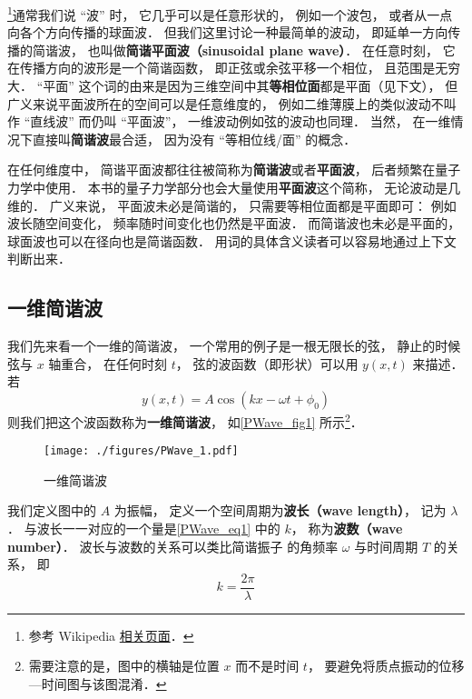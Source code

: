 

\footnote{参考 Wikipedia \href{https://en.wikipedia.org/wiki/Plane_wave}{相关页面}．}通常我们说 “波” 时， 它几乎可以是任意形状的， 例如一个波包， 或者从一点向各个方向传播的球面波． 但我们这里讨论一种最简单的波动， 即延单一方向传播的简谐波， 也叫做\textbf{简谐平面波（sinusoidal plane wave）}． 在任意时刻， 它在传播方向的波形是一个简谐函数， 即正弦或余弦平移一个相位， 且范围是无穷大． “平面” 这个词的由来是因为三维空间中其\textbf{等相位面}都是平面（见下文）， 但广义来说平面波所在的空间可以是任意维度的， 例如二维薄膜上的类似波动不叫作 “直线波” 而仍叫 “平面波”， 一维波动例如弦的波动也同理． 当然， 在一维情况下直接叫\textbf{简谐波}最合适， 因为没有 “等相位线/面” 的概念．

在任何维度中， 简谐平面波都往往被简称为\textbf{简谐波}或者\textbf{平面波}， 后者频繁在量子力学中使用． 本书的量子力学部分也会大量使用\textbf{平面波}这个简称， 无论波动是几维的． 广义来说， 平面波未必是简谐的， 只需要等相位面都是平面即可： 例如波长随空间变化， 频率随时间变化也仍然是平面波． 而简谐波也未必是平面的， 球面波也可以在径向也是简谐函数． 用词的具体含义读者可以容易地通过上下文判断出来．

\subsection{一维简谐波}
我们先来看一个一维的简谐波， 一个常用的例子是一根无限长的弦， 静止的时候弦与 $x$ 轴重合， 在任何时刻 $t$， 弦的波函数（即形状）可以用 $y(x, t)$ 来描述． 若
\begin{equation}\label{PWave_eq1}
y(x, t) = A\cos(k x - \omega t + \phi_0)
\end{equation}
则我们把这个波函数称为\textbf{一维简谐波}， 如\autoref{PWave_fig1} 所示\footnote{需要注意的是，图中的横轴是位置 $x$ 而不是时间 $t$， 要避免将质点振动的位移—时间图与该图混淆．}．

\begin{figure}[ht]
\centering
\texttt{[image: ./figures/PWave\_1.pdf]}
\caption{一维简谐波} \label{PWave_fig1}
\end{figure}

我们定义图中的 $A$ 为振幅， 定义一个空间周期为\textbf{波长（wave length）}， 记为 $\lambda$． 与波长一一对应的一个量是\autoref{PWave_eq1} 中的 $k$， 称为\textbf{波数（wave number）}． 波长与波数的关系可以类比简谐振子 的角频率 $\omega$ 与时间周期 $T$ 的关系， 即
\begin{equation}\label{PWave_eq2}
k = \frac{2\pi}{\lambda}
\end{equation}

